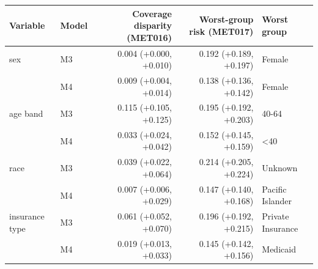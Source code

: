 \begin{tabular}{llrrl}
\toprule
Variable & Model & Coverage disparity (MET016) & Worst-group risk (MET017) & Worst group\\
\midrule
sex & M3 & 0.004 (+0.000, +0.010) & 0.192 (+0.189, +0.197) & Female\\
 & M4 & 0.009 (+0.004, +0.014) & 0.138 (+0.136, +0.142) & Female\\
age band & M3 & 0.115 (+0.105, +0.125) & 0.195 (+0.192, +0.203) & 40-64\\
 & M4 & 0.033 (+0.024, +0.042) & 0.152 (+0.145, +0.159) & <40\\
race & M3 & 0.039 (+0.022, +0.064) & 0.214 (+0.205, +0.224) & Unknown\\
 & M4 & 0.007 (+0.006, +0.029) & 0.147 (+0.140, +0.168) & Pacific Islander\\
insurance type & M3 & 0.061 (+0.052, +0.070) & 0.196 (+0.192, +0.215) & Private Insurance\\
 & M4 & 0.019 (+0.013, +0.033) & 0.145 (+0.142, +0.156) & Medicaid\\
\bottomrule
\end{tabular}
